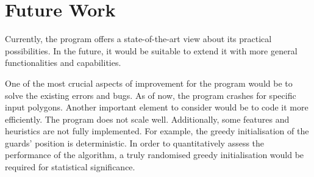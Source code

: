 
\section{Future Work}
Currently, the program offers a state-of-the-art view about its practical possibilities.
In the future, it would be suitable to extend it with more general functionalities and capabilities.

One of the most crucial aspects of improvement for the program would be to solve the existing errors and bugs. As of now, the program crashes for specific input polygons. Another important element to consider would be to code it more efficiently. The program does not scale well. 
Additionally, some features and heuristics are not fully implemented. For example, the greedy initialisation of the guards' position is deterministic. In order to quantitatively assess the performance of the algorithm, a truly randomised greedy initialisation would be required for statistical significance.

